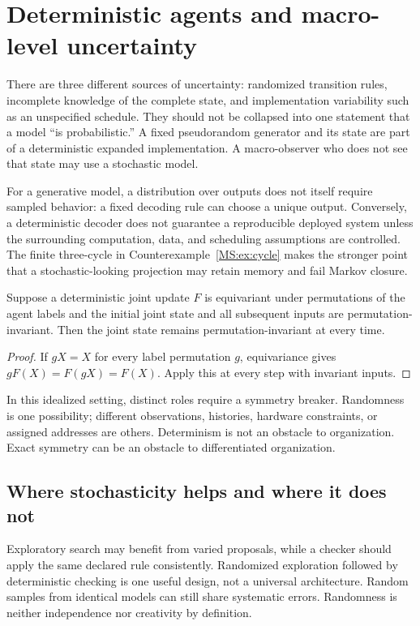 \section{Deterministic agents and macro-level uncertainty}\label{MS:sec:determinism}
There are three different sources of uncertainty: randomized transition rules, incomplete knowledge of the complete state, and implementation variability such as an unspecified schedule. They should not be collapsed into one statement that a model ``is probabilistic.'' A fixed pseudorandom generator and its state are part of a deterministic expanded implementation. A macro-observer who does not see that state may use a stochastic model.

For a generative model, a distribution over outputs does not itself require sampled behavior: a fixed decoding rule can choose a unique output. Conversely, a deterministic decoder does not guarantee a reproducible deployed system unless the surrounding computation, data, and scheduling assumptions are controlled. The finite three-cycle in Counterexample~\ref{MS:ex:cycle} makes the stronger point that a stochastic-looking projection may retain memory and fail Markov closure.

\begin{MSproposition}\label{MS:prop:symmetry}
Suppose a deterministic joint update $F$ is equivariant under permutations of the agent labels and the initial joint state and all subsequent inputs are permutation-invariant. Then the joint state remains permutation-invariant at every time.
\end{MSproposition}
\begin{proof}
If $gX=X$ for every label permutation $g$, equivariance gives $gF(X)=F(gX)=F(X)$. Apply this at every step with invariant inputs.
\end{proof}

In this idealized setting, distinct roles require a symmetry breaker. Randomness is one possibility; different observations, histories, hardware constraints, or assigned addresses are others. Determinism is not an obstacle to organization. Exact symmetry can be an obstacle to differentiated organization.

\subsection{Where stochasticity helps and where it does not}
Exploratory search may benefit from varied proposals, while a checker should apply the same declared rule consistently. Randomized exploration followed by deterministic checking is one useful design, not a universal architecture. Random samples from identical models can still share systematic errors. Randomness is neither independence nor creativity by definition.

